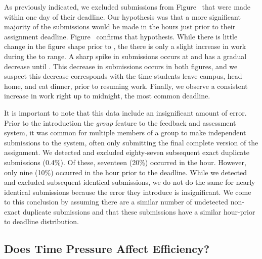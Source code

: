 As previously indicated, we excluded submissions from
Figure~ that were made within one day of their
deadline. Our hypothesis was that a more significant majority of the
submissions would be made in the hours just prior to their assignment
deadline. Figure~ confirms that hypothesis. While
there is little change in the figure shape prior to , the there is only
a slight increase in work during the  to  range. A sharp spike in
submissions occurs at  and has a gradual decrease until . This
decrease in submissions occurs in both figures, and we suspect this decrease
corresponds with the time students leave campus, head home, and eat dinner,
prior to resuming work. Finally, we observe a consistent increase in work right
up to midnight, the most common deadline.

It is important to note that this data include an insignificant amount of
error. Prior to the introduction the \emph{group} feature to the feedback and
assessment system, it was common for multiple members of a group to make
independent submissions to the system, often only submitting the final complete
version of the assignment. We detected and excluded eighty-seven subsequent
exact duplicate submissions (0.4\%). Of these, seventeen (20\%) occurred in the
 hour. However, only nine (10\%) occurred in the hour prior to the
deadline. While we detected and excluded subsequent identical submissions, we
do not do the same for nearly identical submissions because the error they
introduce is insignificant. We come to this conclusion by assuming there are a
similar number of undetected non-exact duplicate submissions and that these
submissions have a similar hour-prior to deadline distribution.

\subsection{Does Time Pressure Affect Efficiency?}

